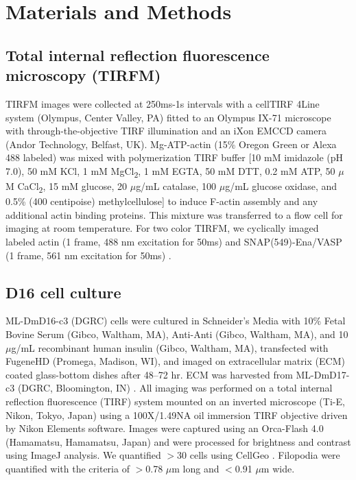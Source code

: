 \section{Materials and Methods}\label{ch02-materials-methods}

\subsection{Total internal reflection fluorescence microscopy (TIRFM)}\label{ena-mm-tirf}

TIRFM images were collected at 250ms-1s intervals with a cellTIRF 4Line system (Olympus, Center Valley, PA) fitted to an Olympus IX-71 microscope with through-the-objective TIRF illumination and an iXon EMCCD camera (Andor Technology, Belfast, UK). Mg-ATP-actin (15\% Oregon Green or Alexa 488 labeled) was mixed with polymerization TIRF buffer [10 mM imidazole (pH 7.0), 50 mM KCl, 1 mM MgCl\textsubscript{2}, 1 mM EGTA, 50 mM DTT, 0.2 mM ATP, 50 $\mu$M CaCl\textsubscript{2}, 15 mM glucose, 20 $\mu$g/mL catalase, 100 $\mu$g/mL glucose oxidase, and 0.5\% (400 centipoise) methylcellulose] to induce F-actin assembly and any additional actin binding proteins. This mixture was transferred to a flow cell for imaging at room temperature. For two color TIRFM, we cyclically imaged labeled actin (1 frame, 488 nm excitation for 50ms) and SNAP(549)-Ena/VASP (1 frame, 561 nm excitation for 50ms) \citep{winkelman_ena/vasp_2014}.

\subsection{D16 cell culture}\label{ena-mm-cell-culture}

ML-DmD16-c3 (DGRC) cells were cultured in Schneider's Media with 10\% Fetal Bovine Serum (Gibco, Waltham, MA), Anti-Anti (Gibco, Waltham, MA), and 10 $\mu$g/mL recombinant human insulin (Gibco, Waltham, MA), transfected with FugeneHD (Promega, Madison, WI), and imaged on extracellular matrix (ECM) coated glass-bottom dishes after 48–72 hr. ECM was harvested from ML-DmD17-c3 (DGRC, Bloomington, IN) \citep{currie_using_2011}. All imaging was performed on a total internal reflection fluorescence (TIRF) system mounted on an inverted microscope (Ti-E, Nikon, Tokyo, Japan) using a 100X/1.49NA oil immersion TIRF objective driven by Nikon Elements software. Images were captured using an Orca-Flash 4.0 (Hamamatsu, Hamamatsu, Japan) and were processed for brightness and contrast using ImageJ \citep{schneider_nih_2012} analysis. We quantified $>$30 cells using CellGeo \citep{tsygankov_cellgeo:_2014}. Filopodia were quantified with the criteria of $>$0.78 $\mu$m long and $<$0.91 $\mu$m wide. 

